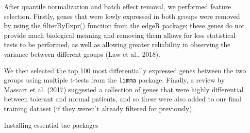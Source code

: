 \documentclass[a4paper,9pt,twocolumn,twoside,]{pinp}
\begin{document}
After quantile normalization and batch effect removal, we performed
feature selection. Firstly, genes that were lowly expressed in both
groups were removed by using the filterByExpr() function from the edgeR
package; these genes do not provide much biological meaning and removing
them allows for less statistical tests to be performed, as well as
allowing greater reliability in observing the variance between different
groups (Law et al., 2018).

We then selected the top 100 most differentially expressed genes between
the two groups using multiple t-tests from the \texttt{limma} package.
Finally, a review by Massart et al. (2017) suggested a collection of
genes that were highly differential between tolerant and normal
patients, and so these were also added to our final training dataset (if
they weren't already filtered for previously).

Installing essential tac packages

\begin{Shaded}
\begin{Highlighting}[]
\end{Highlighting}
\end{Shaded}

\begin{Shaded}
\begin{Highlighting}[]
\NormalTok{(}\NormalTok{)}
\StringTok{ }\NormalTok{()}
\StringTok{ }
\StringTok{ }

\NormalTok{(}\NormalTok{)}
 \NormalTok{)}
\StringTok{ }\NormalTok{(}
     \NormalTok{, }
     \NormalTok{)}
\end{Highlighting}
\end{Shaded}
\end{document}
